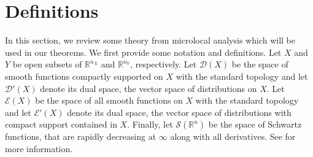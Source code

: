 \documentclass[11pt]{article}
\newcommand{\br}{\mathbb{R}}
\numberwithin{equation}{section}
\newcommand{\intt}{{\operatorname{int}}}
\newcommand{\Dc}{\mathcal{D}}
\newcommand{\Ec}{\mathcal{E}}
\newcommand{\Sc}{\mathcal{S}}
\newcommand{\rn}{{{\mathbb R}^n}}
\theoremstyle{definition}
\begin{document}
\section{Definitions}\label{sect:defns} 

In this section, we review some theory from microlocal analysis which will be used in our theorems. We first provide some
notation and definitions.  Let $X$ and $Y$ be open subsets of
{$\br^{n_X}$ and $\br^{n_Y}$, respectively.}  Let $\Dc(X)$ be the space of smooth functions compactly
supported on $X$ with the standard topology and let $\mathcal{D}'(X)$
denote its dual space, the vector space of distributions on $X$.  Let
$\Ec(X)$ be the space of all smooth functions on $X$ with the standard
topology and let $\mathcal{E}'(X)$ denote its dual space, the vector
space of distributions with compact support contained in $X$. Finally,
let $\Sc(\rn)$ be the space of Schwartz functions, that are rapidly
decreasing at $\infty$ along with all derivatives. See \cite{Rudin:FA}
for more information. 

\end{document}
